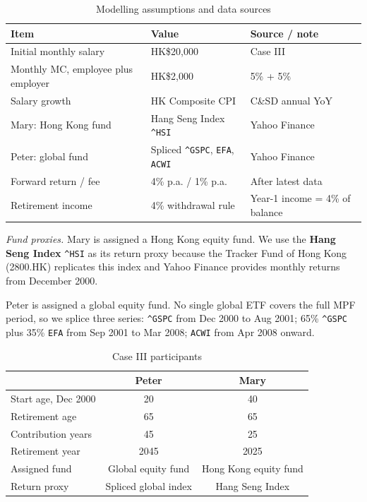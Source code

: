 \documentclass[12pt, letterpaper]{article}
\begin{document}
\begin{table}[H]
  \centering
  \caption{Modelling assumptions and data sources}
  \label{tab:assumptions}
  \small
  \begin{tabular}{@{}lll@{}}
    \toprule
    Item & Value & Source / note \\
    \midrule
    Initial monthly salary & HK\$20,000 & Case III \\
    Monthly MC, employee plus employer & HK\$2,000 & 5\% + 5\% \\
    Salary growth & HK Composite CPI & C\&SD annual YoY \\
    Mary: Hong Kong fund & Hang Seng Index \texttt{\^{}HSI} & Yahoo Finance \\
    Peter: global fund & Spliced \texttt{\^{}GSPC}, \texttt{EFA}, \texttt{ACWI} & Yahoo Finance \\
    Forward return / fee & 4\% p.a. / 1\% p.a. & After latest data \\
    Retirement income & 4\% withdrawal rule & Year-1 income = 4\% of balance \\
    \bottomrule
  \end{tabular}

  \vspace{0.4em}
  {\footnotesize
  \textit{Fund proxies.} Mary is assigned a Hong Kong equity fund. We use the \textbf{Hang Seng Index} \texttt{\^{}HSI} as its return proxy because the Tracker Fund of Hong Kong (2800.HK) replicates this index and Yahoo Finance provides monthly returns from December 2000.

  Peter is assigned a global equity fund. No single global ETF covers the full MPF period, so we splice three series: \texttt{\^{}GSPC} from Dec 2000 to Aug 2001; 65\% \texttt{\^{}GSPC} plus 35\% \texttt{EFA} from Sep 2001 to Mar 2008; \texttt{ACWI} from Apr 2008 onward.
  }
\end{table}

\begin{table}[H]
  \centering
  \caption{Case III participants}
  \label{tab:participants}
  \small
  \begin{tabular}{@{}lcc@{}}
    \toprule
    & Peter & Mary \\
    \midrule
    Start age, Dec 2000 & 20 & 40 \\
    Retirement age & 65 & 65 \\
    Contribution years & 45 & 25 \\
    Retirement year & 2045 & 2025 \\
    Assigned fund & Global equity fund & Hong Kong equity fund \\
    Return proxy & Spliced global index & Hang Seng Index \\
    \bottomrule
  \end{tabular}
\end{table}
\end{document}
